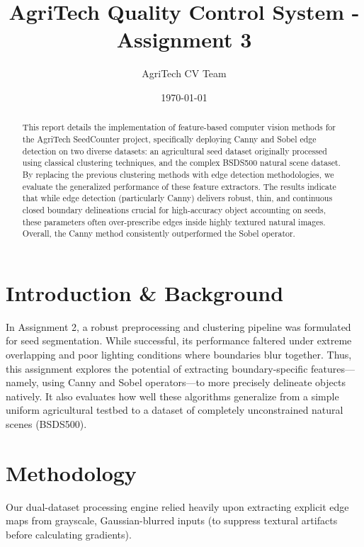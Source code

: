 \documentclass[11pt]{article}
\title{AgriTech Quality Control System - Assignment 3}
\author{AgriTech CV Team}
\date{\today}
\begin{document}
\maketitle

\begin{abstract}
This report details the implementation of feature-based computer vision methods for the AgriTech SeedCounter project, specifically deploying Canny and Sobel edge detection on two diverse datasets: an agricultural seed dataset originally processed using classical clustering techniques, and the complex BSDS500 natural scene dataset. By replacing the previous clustering methods with edge detection methodologies, we evaluate the generalized performance of these feature extractors. The results indicate that while edge detection (particularly Canny) delivers robust, thin, and continuous closed boundary delineations crucial for high-accuracy object accounting on seeds, these parameters often over-prescribe edges inside highly textured natural images. Overall, the Canny method consistently outperformed the Sobel operator.
\end{abstract}

\section{Introduction \& Background}
In Assignment 2, a robust preprocessing and clustering pipeline was formulated for seed segmentation. While successful, its performance faltered under extreme overlapping and poor lighting conditions where boundaries blur together. Thus, this assignment explores the potential of extracting boundary-specific features—namely, using Canny and Sobel operators—to more precisely delineate objects natively. It also evaluates how well these algorithms generalize from a simple uniform agricultural testbed to a dataset of completely unconstrained natural scenes (BSDS500).

\section{Methodology}
Our dual-dataset processing engine relied heavily upon extracting explicit edge maps from grayscale, Gaussian-blurred inputs (to suppress textural artifacts before calculating gradients). 
\end{document}
